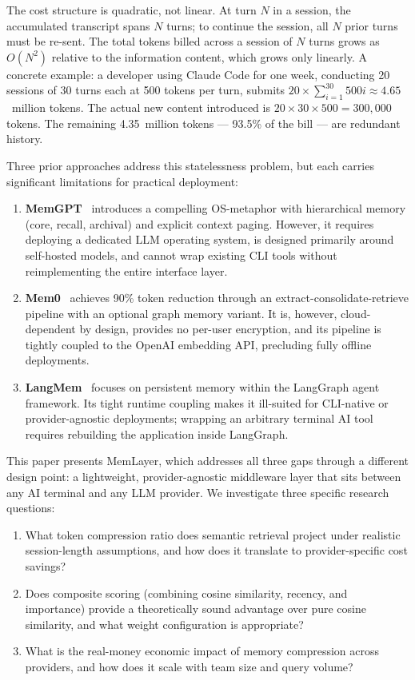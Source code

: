 \documentclass[10pt,twocolumn]{article}
\begin{document}
The cost structure is quadratic, not linear. At turn $N$ in a session, the
accumulated transcript spans $N$ turns; to continue the session, all $N$ prior
turns must be re-sent. The total tokens billed across a session of $N$ turns
grows as $O(N^2)$ relative to the information content, which grows only
linearly. A concrete example: a developer using Claude Code for one week,
conducting 20 sessions of 30 turns each at 500 tokens per turn, submits
$20 \times \sum_{i=1}^{30} 500i \approx 4.65$~million tokens. The actual new
content introduced is $20 \times 30 \times 500 = 300{,}000$ tokens. The
remaining 4.35~million tokens --- 93.5\% of the bill --- are redundant history.

Three prior approaches address this statelessness problem, but each carries
significant limitations for practical deployment:
\begin{enumerate}
  \item \textbf{MemGPT}~\citep{packer2023memgpt} introduces a compelling
    OS-metaphor with hierarchical memory (core, recall, archival) and explicit
    context paging. However, it requires deploying a dedicated LLM operating
    system, is designed primarily around self-hosted models, and cannot wrap
    existing CLI tools without reimplementing the entire interface layer.
  \item \textbf{Mem0}~\citep{chhikara2025mem0} achieves 90\% token reduction
    through an extract-consolidate-retrieve pipeline with an optional graph
    memory variant. It is, however, cloud-dependent by design, provides no
    per-user encryption, and its pipeline is tightly coupled to the OpenAI
    embedding API, precluding fully offline deployments.
  \item \textbf{LangMem}~\citep{chase2024langmem} focuses on persistent memory
    within the LangGraph agent framework. Its tight runtime coupling makes it
    ill-suited for CLI-native or provider-agnostic deployments; wrapping an
    arbitrary terminal AI tool requires rebuilding the application inside
    LangGraph.
\end{enumerate}

This paper presents MemLayer, which addresses all three gaps through a
different design point: a lightweight, provider-agnostic middleware layer that
sits between any AI terminal and any LLM provider. We investigate three specific
research questions:
\begin{enumerate}
  \item What token compression ratio does semantic retrieval project under
    realistic session-length assumptions, and how does it translate to
    provider-specific cost savings?
  \item Does composite scoring (combining cosine similarity, recency, and
    importance) provide a theoretically sound advantage over pure cosine
    similarity, and what weight configuration is appropriate?
  \item What is the real-money economic impact of memory compression across
    providers, and how does it scale with team size and query volume?
\end{enumerate}
\end{document}
